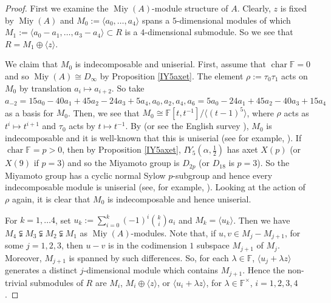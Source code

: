 \documentclass[11pt, a4paper]{article}
\theoremstyle{plain}
\theoremstyle{definition}
\newcommand\al{\alpha}
\newcommand\lm{\lambda}
\newcommand\la{\langle}
\newcommand\ra{\rangle}
\DeclareMathOperator{\ch}{char}
\newcommand\FF{\mathbb{F}}
\DeclareMathOperator{\Miy}{Miy}
\newcommand{\0}{\overline{0}}
\newcommand{\2}{\overline{2}}
\newcommand{\1}{\mathbbm{1}}
\begin{document}
\begin{proof}
First we examine the $\Miy(A)$-module structure of $A$.  Clearly, $z$ is fixed by $\Miy(A)$ and $M_0 := \la a_0, \dots, a_4 \ra$ spans a $5$-dimensional modules of which $M_1:= \la a_0-a_1, \dots, a_3-a_4 \ra \subset R$ is a $4$-dimensional submodule.  So we see that $R = M_1 \oplus \la z \ra$.

We claim that $M_0$ is indecomposable and uniserial.  First, assume that $\ch \FF = 0$ and so $\Miy(A) \cong D_{\infty}$ by Proposition \ref{IY5axet}.  The element $\rho := \tau_0\tau_1$ acts on $M_0$ by translation $a_i \mapsto a_{i+2}$.  So take $a_{-2} = 15a_0-40a_1+45a_2-24a_3+5a_4, a_0, a_2, a_4, a_6 = 5a_0-24a_1+45a_2-40a_3+15a_4$ as a basis for $M_0$.  Then, we see that $M_0 \cong \FF[t, t^{-1}]/\la (t-1)^5 \ra$, where $\rho$ acts as $t^i \mapsto t^{i+1}$ and $\tau_0$ acts by $t \mapsto t^{-1}$.  By \cite{infdihedral} (or see the English survey \cite[Theorem 5]{infdihsurvey}), $M_0$ is indecomposable and it is well-known that this is uniserial (see for example, \cite{infdihuniserial}).  If $\ch \FF = p >0$, then by Proposition \ref{IY5axet}, $IY_5(\al, \frac{1}{2})$ has axet $X(p)$ (or $X(9)$ if $p=3$) and so the Miyamoto group is $D_{2p}$ (or $D_{18}$ is $p=3$).  So the Miyamoto group has a cyclic normal Sylow $p$-subgroup and hence every indecomposable module is uniserial (see, for example, \cite[pages 35-37]{alperin}).  Looking at the action of $\rho$ again, it is clear that $M_0$ is indecomposable and hence uniserial.

For $k = 1, \dots 4$, set $u_k := \sum_{i=0}^k (-1)^i \binom{k}{i}a_i$ and $M_k = \la u_k \ra$.  Then we have $M_4 \subsetneqq M_3 \subsetneqq M_2 \subsetneqq M_1$ as $\Miy(A)$-modules.  Note that, if $u,v \in M_j - M_{j+1}$, for some $j = 1,2,3$, then $u-v$ is in the codimension $1$ subspace $M_{j+1}$ of $M_j$.  Moreover, $M_{j+1}$ is spanned by such differences.  So, for each $\lm \in \FF$, $\la u_j + \lm z \ra$ generates a distinct $j$-dimensional module which contains $M_{j+1}$.  Hence the non-trivial submodules of $R$ are $M_i$, $M_i \oplus \la z \ra$, or $\la u_i + \lm z \ra$, for $\lm \in \FF^\times$, $i = 1,2,3,4$.


\end{proof}
\end{document}

